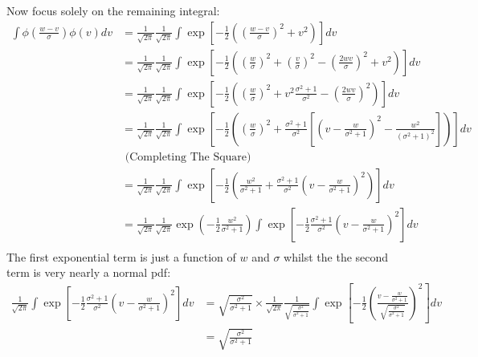 \documentclass{article}
\begin{document}
Now focus solely on the remaining integral:
\begin{align*}
\int \phi\left(\frac{w - v}{\sigma}\right) \phi(v) dv  &= 
\frac{1}{\sqrt{2\pi}} \frac{1}{\sqrt{2\pi}} 
\int \exp \left[
    -\frac{1}{2} 
    \left(
        \left(\frac{w - v}{\sigma}\right)^2 +
        v^2
    \right)
\right] dv \\
&= 
\frac{1}{\sqrt{2\pi}} \frac{1}{\sqrt{2\pi}} 
\int \exp \left[
    -\frac{1}{2} 
    \left(
        \left(\frac{w }{\sigma}\right)^2 +
        \left(\frac{v }{\sigma}\right)^2 
        -\left(\frac{2wv }{\sigma}\right)^2 +
        v^2
    \right)
\right] dv \\
&=
\frac{1}{\sqrt{2\pi}} \frac{1}{\sqrt{2\pi}} 
 \int \exp \left[
    -\frac{1}{2} 
    \left(
        \left(\frac{w }{\sigma}\right)^2 +
        v^2 \frac{\sigma^2 + 1}{\sigma^2}  
        -\left(\frac{2wv }{\sigma}\right)^2 
    \right)
\right] dv \\
&=
\frac{1}{\sqrt{2\pi}} \frac{1}{\sqrt{2\pi}} 
 \int \exp \left[
    -\frac{1}{2} 
    \left(
        \left(\frac{w }{\sigma}\right)^2 +
        \frac{\sigma^2 + 1}{\sigma^2} \left[
            \left(
                v - \frac{w}{\sigma^2 + 1}
            \right)^2 - \frac{w^2}{(\sigma^2 + 1)^2}
        \right]
    \right)
\right] dv \\ &\text{ (Completing  The Square)} \\
&=
\frac{1}{\sqrt{2\pi}} \frac{1}{\sqrt{2\pi}} 
 \int \exp \left[
    -\frac{1}{2} 
    \left(
        \frac{w^2 }{\sigma^2 + 1} +
        \frac{\sigma^2 + 1}{\sigma^2} 
            \left(
                v - \frac{w}{\sigma^2 + 1}
            \right)^2 
    \right)
\right] dv \  \\
&= 
\frac{1}{\sqrt{2\pi}} \frac{1}{\sqrt{2\pi}} 
 \exp \left(
    -\frac{1}{2} 
        \frac{w^2 }{\sigma^2 + 1}
         \right)
\int \exp\left[
    -\frac{1}{2}
        \frac{\sigma^2 + 1}{\sigma^2} 
            \left(
                v - \frac{w}{\sigma^2 + 1}
            \right)^2 
\right] dv \  \\
\end{align*}
The first exponential term is just a function of $w$ and $\sigma$ 
whilst the the second term is very nearly a normal pdf:
\begin{align*}
\frac{1}{\sqrt{2\pi}}
\int \exp\left[
    -\frac{1}{2}
        \frac{\sigma^2 + 1}{\sigma^2} 
            \left(
                v - \frac{w}{\sigma^2 + 1}
            \right)^2 
\right] dv &=  
                    \sqrt{
                        \frac{\sigma^2}{\sigma^2 + 1}
                    } \times
\frac{1}{\sqrt{2\pi}} 
\frac{1}{
                    \sqrt{
                        \frac{\sigma^2}{\sigma^2 + 1}
                    }
}
\int \exp\left[
    -\frac{1}{2}
            \left(
                \frac{v - \frac{w}{\sigma^2 + 1}}{
                    \sqrt{
                        \frac{\sigma^2}{\sigma^2 + 1}
                    }
                }
            \right)^2 
\right] dv  \\
&= 
                    \sqrt{
                        \frac{\sigma^2}{\sigma^2 + 1}
                    } 
\end{align*}
\end{document}
